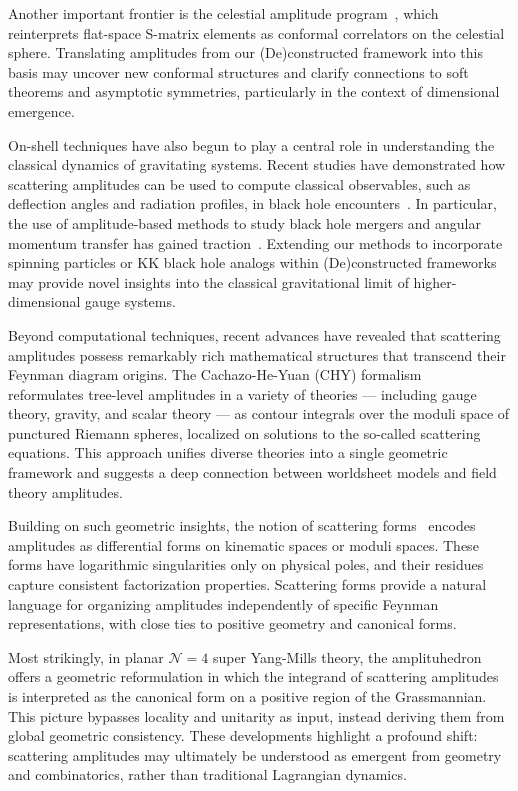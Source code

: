 \documentclass[12pt]{article}
\numberwithin{equation}{section}
\begin{document}
Another important frontier is the celestial amplitude program~\cite{Pasterski:2017kqt}, which reinterprets flat-space S-matrix elements as conformal correlators on the celestial sphere. Translating amplitudes from our (De)constructed framework into this basis may uncover new conformal structures and clarify connections to soft theorems and asymptotic symmetries, particularly in the context of dimensional emergence.

On-shell techniques have also begun to play a central role in understanding the classical dynamics of gravitating systems. Recent studies have demonstrated how scattering amplitudes can be used to compute classical observables, such as deflection angles and radiation profiles, in black hole encounters~\cite{Guevara:2019fsj,Neill:2013wsa}. In particular, the use of amplitude-based methods to study black hole mergers and angular momentum transfer has gained traction~\cite{Aoki:2024boe}. Extending our methods to incorporate spinning particles or KK black hole analogs within (De)constructed frameworks may provide novel insights into the classical gravitational limit of higher-dimensional gauge systems.

Beyond computational techniques, recent advances have revealed that scattering amplitudes possess remarkably rich mathematical structures that transcend their Feynman diagram origins. The Cachazo-He-Yuan (CHY) formalism~\cite{Cachazo:2013gna}~\cite{Cachazo:2013hca}~\cite{Cachazo:2013iea} reformulates tree-level amplitudes in a variety of theories — including gauge theory, gravity, and scalar theory — as contour integrals over the moduli space of punctured Riemann spheres, localized on solutions to the so-called scattering equations. This approach unifies diverse theories into a single geometric framework and suggests a deep connection between worldsheet models and field theory amplitudes.

Building on such geometric insights, the notion of scattering forms~\cite{Arkani-Hamed:2017mur} encodes amplitudes as differential forms on kinematic spaces or moduli spaces. These forms have logarithmic singularities only on physical poles, and their residues capture consistent factorization properties. Scattering forms provide a natural language for organizing amplitudes independently of specific Feynman representations, with close ties to positive geometry and canonical forms.

Most strikingly, in planar \( \mathcal{N}=4 \) super Yang-Mills theory, the amplituhedron offers a geometric reformulation in which the integrand of scattering amplitudes is interpreted as the canonical form on a positive region of the Grassmannian. This picture bypasses locality and unitarity as input, instead deriving them from global geometric consistency. These developments highlight a profound shift: scattering amplitudes may ultimately be understood as emergent from geometry and combinatorics, rather than traditional Lagrangian dynamics.
\end{document}
